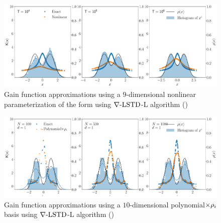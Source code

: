 \begin{figure}
	\includegraphics[width=6in]{images/Chap4_diff_td_nl}
	\caption[Performance comparison of $\gradTD$ with nonlinear parameterization]{Gain function approximations using a $9$-dimensional nonlinear parameterization of the form using $\gradTD$-L algorithm ()}
	\label{fig:diff_td_nl}
\end{figure}

\begin{figure}
	\includegraphics[width=6in]{images/Chap4_lang_td_wt_polynomials}
	\caption[Performance comparison of $\gradTD$-L with polynomial basis]{Gain function approximations using a $10$-dimensional polynomial$\times \rho_i$ basis using $\gradTD$-L algorithm ()}
	\label{fig:diff_td_lang_linear}
\end{figure}

